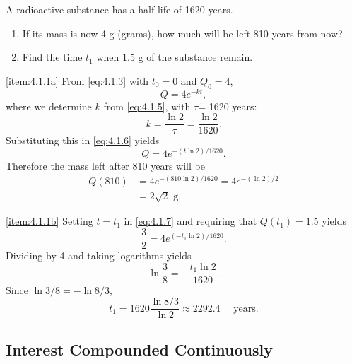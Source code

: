 \documentclass{ximera}
\begin{document}
\begin{example}\label{example:4.1.1}
A  radioactive substance has a half-life of 1620 years.
\begin{enumerate}
\item \label{item:4.1.1a}%
If its mass is now 4 g (grams), how much will be left 810 years
from now?
\item \label{item:4.1.1b}%
Find the time $t_1$ when 1.5 g of the substance remain.
\end{enumerate}
\begin{explanation}
\ref{item:4.1.1a}  From \eqref{eq:4.1.3} with $t_0=0$ and
$Q_0=4$,
\begin{equation} \label{eq:4.1.6}
Q=4e^{-kt},
\end{equation}
 where we determine $k$ from \eqref{eq:4.1.5}, with $\tau$=
1620 years:
$$
k=\frac{\ln2}{\tau}=\frac{\ln2}{1620}.
$$
 Substituting this in \eqref{eq:4.1.6} yields
\begin{equation} \label{eq:4.1.7}
Q=4e^{-(t\ln2)/1620}.
\end{equation}
 Therefore the mass left after 810 years will be
$$\begin{array}{rl}
Q(810) &=4e^{-(810\ln2)/1620}=4e^{-(\ln2)/2} \\
&=2\sqrt{2} \mbox{ g}.
\end{array}$$

\ref{item:4.1.1b}
 Setting $t=t_1$  in \eqref{eq:4.1.7} and requiring that
$Q(t_1)=1.5$ yields
$$
\frac{3}{2}=4e^{(-t_1\ln2)/1620}.
$$
Dividing by 4 and taking logarithms yields
$$
\ln\frac{3}{8}=-\frac{t_1\ln2}{1620}.
$$
Since $\ln3/8=-\ln8/3$,
$$
t_1=1620\frac{\ln8/3}{\ln2}\approx  2292.4\quad\mbox{ years}.
$$
\end{explanation}
\end{example}

\subsection*{Interest Compounded Continuously}
\end{document}
